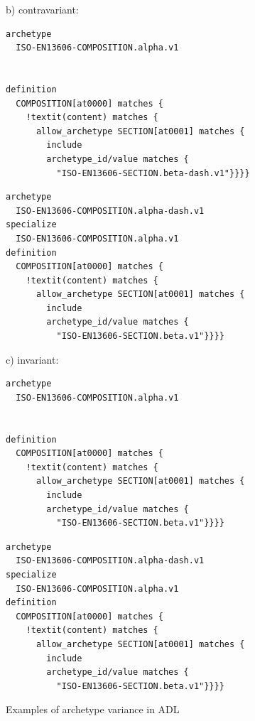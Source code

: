 \documentclass[preprint,3p,onecolumn,times,review]{article}
\begin{document}
{\begin{figure}[!htbp]
b) contravariant:

\begin{minipage}{0.49\linewidth}
\begin{Verbatim}[frame=single,fontsize=\small, commandchars=!\(\)]
archetype
  ISO-EN13606-COMPOSITION.alpha.v1


definition
  COMPOSITION[at0000] matches {
    !textit(content) matches {
      allow_archetype SECTION[at0001] matches {
        include
        archetype_id/value matches {
          "ISO-EN13606-SECTION.beta-dash.v1"}}}}
\end{Verbatim}
\end{minipage}
\begin{minipage}{0.49\linewidth}
\begin{Verbatim}[frame=single,fontsize=\small, commandchars=!\(\)]
archetype
  ISO-EN13606-COMPOSITION.alpha-dash.v1
specialize
  ISO-EN13606-COMPOSITION.alpha.v1
definition
  COMPOSITION[at0000] matches {
    !textit(content) matches {
      allow_archetype SECTION[at0001] matches {
        include
        archetype_id/value matches {
          "ISO-EN13606-SECTION.beta.v1"}}}}
\end{Verbatim}
\end{minipage}

c) invariant:

\begin{minipage}{0.49\linewidth}
\begin{Verbatim}[frame=single,fontsize=\small, commandchars=!\(\)]
archetype
  ISO-EN13606-COMPOSITION.alpha.v1


definition
  COMPOSITION[at0000] matches {
    !textit(content) matches {
      allow_archetype SECTION[at0001] matches {
        include
        archetype_id/value matches {
          "ISO-EN13606-SECTION.beta.v1"}}}}
\end{Verbatim}
\end{minipage}
\begin{minipage}{0.49\linewidth}
\begin{Verbatim}[frame=single,fontsize=\small, commandchars=!\(\)]
archetype
  ISO-EN13606-COMPOSITION.alpha-dash.v1
specialize
  ISO-EN13606-COMPOSITION.alpha.v1
definition
  COMPOSITION[at0000] matches {
    !textit(content) matches {
      allow_archetype SECTION[at0001] matches {
        include
        archetype_id/value matches {
          "ISO-EN13606-SECTION.beta.v1"}}}}
\end{Verbatim}
\end{minipage}
  \caption{Examples of archetype variance in ADL}\label{fig:archetype_variances_adl}
\end{figure}


}
\end{document}
